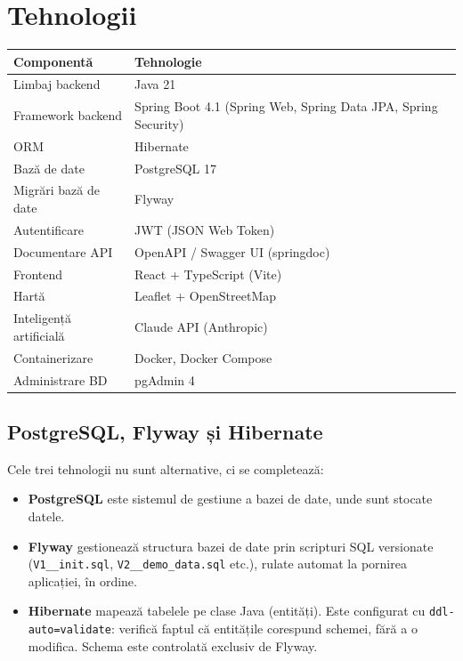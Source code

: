 \documentclass[11pt,a4paper]{article}
\begin{document}
\section{Tehnologii}

\begin{center}
\begin{tabularx}{\textwidth}{@{}lX@{}}
\toprule
\textbf{Componentă} & \textbf{Tehnologie} \\
\midrule
Limbaj backend      & Java 21 \\
Framework backend   & Spring Boot 4.1 (Spring Web, Spring Data JPA, Spring Security) \\
ORM                 & Hibernate \\
Bază de date        & PostgreSQL 17 \\
Migrări bază de date & Flyway \\
Autentificare       & JWT (JSON Web Token) \\
Documentare API     & OpenAPI / Swagger UI (springdoc) \\
Frontend            & React + TypeScript (Vite) \\
Hartă               & Leaflet + OpenStreetMap \\
Inteligență artificială & Claude API (Anthropic) \\
Containerizare      & Docker, Docker Compose \\
Administrare BD     & pgAdmin 4 \\
\bottomrule
\end{tabularx}
\end{center}

\subsection{PostgreSQL, Flyway și Hibernate}
Cele trei tehnologii nu sunt alternative, ci se completează:
\begin{itemize}
  \item \textbf{PostgreSQL} este sistemul de gestiune a bazei de date, unde sunt stocate datele.
  \item \textbf{Flyway} gestionează structura bazei de date prin scripturi SQL versionate
        (\texttt{V1\_\_init.sql}, \texttt{V2\_\_demo\_data.sql} etc.), rulate automat
        la pornirea aplicației, în ordine.
  \item \textbf{Hibernate} mapează tabelele pe clase Java (entități). Este configurat cu
        \texttt{ddl-auto=validate}: verifică faptul că entitățile corespund schemei,
        fără a o modifica. Schema este controlată exclusiv de Flyway.
\end{itemize}
\end{document}
